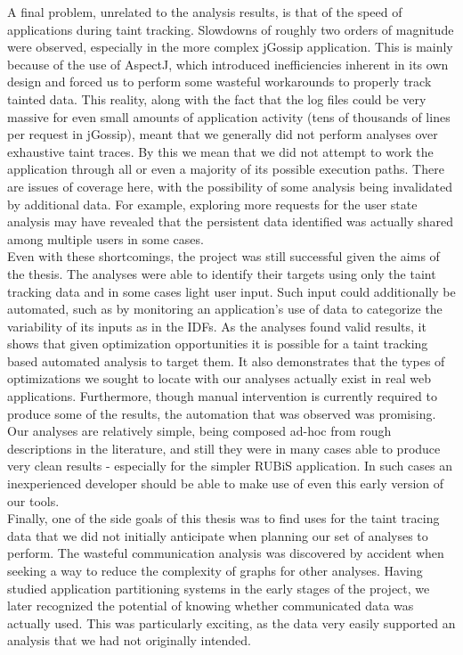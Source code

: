 \documentclass[msc,oneside]{ubcthesis}
\begin{document}
A final problem, unrelated to the analysis results, is that of the speed of applications during taint tracking. Slowdowns of roughly two orders of magnitude were observed, especially in the more complex jGossip application. This is mainly because of the use of AspectJ, which introduced inefficiencies inherent in its own design and forced us to perform some wasteful workarounds to properly track tainted data. This reality, along with the fact that the log files could be very massive for even small amounts of application activity (tens of thousands of lines per request in jGossip), meant that we generally did not perform analyses over exhaustive taint traces. By this we mean that we did not attempt to work the application through all or even a majority of its possible execution paths. There are issues of coverage here, with the possibility of some analysis being invalidated by additional data. For example, exploring more requests for the user state analysis may have revealed that the persistent data identified was actually shared among multiple users in some cases.\\

Even with these shortcomings, the project was still successful given the aims of the thesis. The analyses were able to identify their targets using only the taint tracking data and in some cases light user input. Such input could additionally be automated, such as by monitoring an application's use of data to categorize the variability of its inputs as in the IDFs. As the analyses found valid results, it shows that given optimization opportunities it is possible for a taint tracking based automated analysis to target them. It also demonstrates that the types of optimizations we sought to locate with our analyses actually exist in real web applications. Furthermore, though manual intervention is currently required to produce some of the results, the automation that was observed was promising. Our analyses are relatively simple, being composed ad-hoc from rough descriptions in the literature, and still they were in many cases able to produce very clean results - especially for the simpler RUBiS application. In such cases an inexperienced developer should be able to make use of even this early version of our tools.\\

Finally, one of the side goals of this thesis was to find uses for the taint tracing data that we did not initially anticipate when planning our set of analyses to perform. The wasteful communication analysis was discovered by accident when seeking a way to reduce the complexity of graphs for other analyses. Having studied application partitioning systems in the early stages of the project, we later recognized the potential of knowing whether communicated data was actually used. This was particularly exciting, as the data very easily supported an analysis that we had not originally intended.
\end{document}
